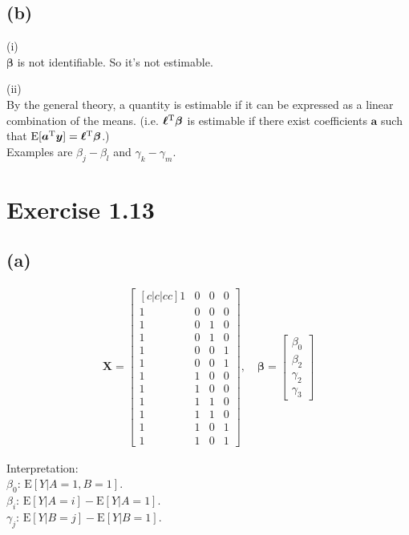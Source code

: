 \documentclass[a4paper]{article}
\newcommand{\E}{\mathrm{E}}
\begin{document}
\subsection{(b)}

(i)\\
$\bm{\beta}$ is not identifiable. So it's not estimable.

(ii)\\
By the general theory, a quantity is estimable if it can be expressed as a linear combination of the means. (i.e. $\bm{\ell}^{\rm T}\bm{\beta}$ is estimable if there exist coefficients $\bm{a}$ such that $\E[\bm{a}^{\rm T} \bm{y}] = \bm{\ell}^{\rm T}\bm{\beta}$.)\\
Examples are $\beta_{j} - \beta_{l}$ and $\gamma_{k} - \gamma_{m}$.

\vspace{\baselineskip}
\section{Exercise 1.13}

\subsection{(a)}
\begin{align*}
\bm{X} = 
\begin{bmatrix}[c|c|cc]
1 & 0 & 0 & 0\\
1 & 0 & 0 & 0\\
1 & 0 & 1 & 0\\
1 & 0 & 1 & 0\\
1 & 0 & 0 & 1\\
1 & 0 & 0 & 1\\
\hline
1 & 1 & 0 & 0\\
1 & 1 & 0 & 0\\
1 & 1 & 1 & 0\\
1 & 1 & 1 & 0\\
1 & 1 & 0 & 1\\
1 & 1 & 0 & 1
\end{bmatrix}
, \quad
\bm{\beta} =
\begin{bmatrix}
\beta_{0}\\
\beta_{2}\\
\gamma_{2}\\
\gamma_{3}
\end{bmatrix}
\end{align*}

Interpretation:\\
$\beta_{0}$: $\E\left[Y|A = 1, B = 1\right]$.\\
$\beta_{i}$: $\E\left[Y|A = i\right] - \E\left[Y|A = 1\right]$.\\
$\gamma_{j}$: $\E\left[Y|B = j\right] - \E\left[Y|B = 1\right]$.\\
\end{document}
